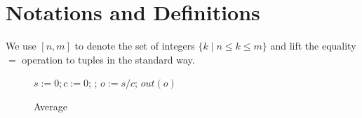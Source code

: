 \documentclass{llncs}
\newcommand{\Var}{\mathtt{Var}}
\newcommand{\Exp}{\mathtt{Exp}}
\newcommand{\Cmd}{\mathtt{Cmd}}
\newcommand{\Grd}{\mathtt{Grd}}
\newcommand{\Prg}{\mathtt{Prg}}
\newcommand{\hide}[1]{}
\newcommand{\cur}{cur()}
\newcommand{\ite}[3]{
	 \ifmmode
	 \mathbf{if}\ #1 \ \mathbf{then}\ #2\  \mathbf{else}\ #3
	 \else
	 \textbf{if}\ #1 \ \textbf{then}\ #2\  \textbf{else}\ #3
	 \fi}
\newcommand{\rloop}{
	\ifmmode
	\mathbf{Loop}
	\else
	\textbf{Loop}
	\fi}
\newcommand{\Z}{\mathbb{Z}}
\begin{document}
\section{Notations and Definitions}
\label{section:integer-reducers}
We use $[n,m]$ to denote the set of integers $\{k\mid n \leq k\leq m\}$ and lift the equality $=$ operation to tuples in the standard way.


\hide{
\begin{equation*}
\begin{array}{rclcl}
\multicolumn{3}{l}{v\in \Var\mbox{, and }c \in \Z}&&\textmd{Variable and Constant}\\
e \in \Exp    &\ \ \  {\triangleq}\ \ \   & v \mid c \mid \cur \mid e + e \mid e - e \mid e \times e \mid *\mid\ldots & &\textmd{Integer Expression}\\
g\in \Grd  & {\triangleq}  & e < e \mid not\ g \mid g \wedge g  \mid \ldots& & \textmd{Guard}\\
s\in \Cmd  & {\triangleq}  & v:= e \mid out(v) \mid \ite{g}{s}{s} \mid s;s && \textmd{Command}\\
p\in \Prg  & {\triangleq}  & s;\rloop\{s\};s&& \textmd{Reducer Program}\\
\end{array}
\end{equation*}}
\begin{wrapfigure}{r}{3cm}
		\vspace{-0.8cm}
	\hide{
		\begin{minipage}{0.32\textwidth}
			\begin{algorithm}[H]
				$m := \cur$; \;
				\Loop{}{
					$t:=\cur$;\;
					\uIf{ $t > m$}{
						$m := t$
					}
				};
				$out(m)$\;
			\end{algorithm}
			\caption*{(a) max}
		\end{minipage}
		\hspace{-0.5cm}
	}
	\begin{minipage}{0.3\textwidth}
		\begin{algorithm}[H]
			$s := 0;c:=0$; \;
			\Loop{}{
				$s := s+\cur$;\;
				$c := c+1$
			};
			$o := s/c$;\;
			$out(o)$\;
		\end{algorithm}
	\end{minipage}
	\hide{
		\begin{minipage}{0.4\textwidth}
			\begin{algorithm}[H]
				$a:=*;s := 0; c:=0$;\;
				\Loop{}{
					$s := s+(\cur-a)^2$; \;
					$c := c+1$
				};
				$o := s/c$;\;
				$out(o)$
			\end{algorithm}
			\caption*{(c) standard deviation}
		\end{minipage}
	}
	\caption{Average}
	\vspace{-0.8cm}
	\label{fig:reducer_example}
\end{wrapfigure}
\end{document}

